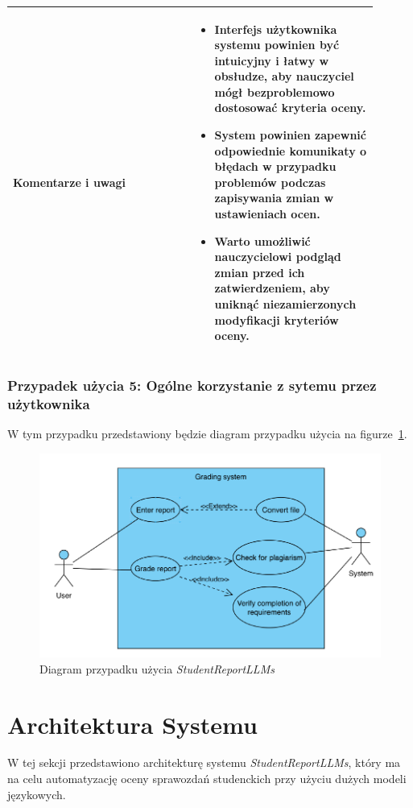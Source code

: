 \documentclass[a4paper, 12pt]{article}
\begin{document}
\begin{table}[H]
\begin{tabular}{|p{0.45\linewidth}|p{0.45\linewidth}|}
\hline
\textbf{Komentarze i uwagi} &
\begin{itemize}
    \item Interfejs użytkownika systemu powinien być intuicyjny i łatwy w obsłudze, aby nauczyciel mógł bezproblemowo dostosować kryteria oceny.
    \item System powinien zapewnić odpowiednie komunikaty o błędach w przypadku problemów podczas zapisywania zmian w ustawieniach ocen.
    \item Warto umożliwić nauczycielowi podgląd zmian przed ich zatwierdzeniem, aby uniknąć niezamierzonych modyfikacji kryteriów oceny.
\end{itemize} \\
\hline
\end{tabular}
\end{table}

\subsubsection{Przypadek użycia 5: Ogólne korzystanie z sytemu przez użytkownika}
W tym przypadku przedstawiony będzie diagram przypadku użycia na figurze~\ref{fig:use-case-diagram}.

\begin{figure}[H]
    \centering
    \includegraphics[width=\textwidth]{img/usecase_diagram}
    \caption{Diagram przypadku użycia \textit{StudentReportLLMs}}
    \label{fig:use-case-diagram}
\end{figure}

\section{Architektura Systemu}
W tej sekcji przedstawiono architekturę systemu \textit{StudentReportLLMs}, który ma na celu automatyzację oceny sprawozdań studenckich przy użyciu dużych modeli językowych.
\end{document}
